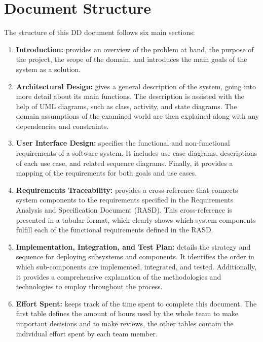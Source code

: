\section{Document Structure}
The structure of this DD document follows six main sections:
\begin{enumerate}
    \item \textbf{Introduction:}
          provides an overview of the problem at hand, the purpose of the project,
          the scope of the domain, and introduces the main goals of the system as a solution.

    \item \textbf{Architectural Design:}
          gives a general description of the system, going into more detail about its main functions.
          The description is assisted with the help of UML diagrams, such as class, activity, and state diagrams.
          The domain assumptions of the examined world are then explained along with any dependencies and constraints.

    \item \textbf{User Interface Design:}
          specifies the functional and non-functional requirements of a software system.
          It includes use case diagrams, descriptions of each use case, and related sequence diagrams.
          Finally, it provides a mapping of the requirements for both goals and use cases.

    \item \textbf{Requirements Traceability:}
          provides a cross-reference that connects system components to the requirements specified in the Requirements Analysis and Specification Document (RASD). 
          This cross-reference is presented in a tabular format, which clearly shows which system components fulfill each of the functional requirements defined in the RASD.

    \item \textbf{Implementation, Integration, and Test Plan:}   
          details the strategy and sequence for deploying subsystems and components. 
          It identifies the order in which sub-components are implemented, integrated, and tested. Additionally, it provides a comprehensive explanation of the methodologies and technologies to employ throughout the process.

    \item \textbf{Effort Spent:}
          keeps track of the time spent to complete this document.
          The first table defines the amount of hours used by the whole team to make important decisions and to make reviews,
          the other tables contain the individual effort spent by each team member.
\end{enumerate}